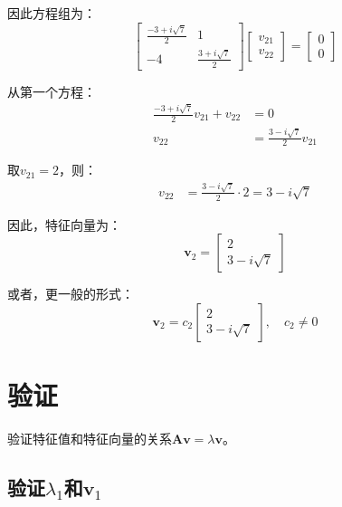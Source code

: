 \documentclass[12pt,a4paper]{article}
\begin{document}
因此方程组为：
\begin{equation}
\begin{bmatrix} \frac{-3 + i\sqrt{7}}{2} & 1 \\ -4 & \frac{3 + i\sqrt{7}}{2} \end{bmatrix} \begin{bmatrix} v_{21} \\ v_{22} \end{bmatrix} = \begin{bmatrix} 0 \\ 0 \end{bmatrix}
\end{equation}

从第一个方程：
\begin{align}
\frac{-3 + i\sqrt{7}}{2} v_{21} + v_{22} &= 0 \\
v_{22} &= \frac{3 - i\sqrt{7}}{2} v_{21}
\end{align}

取$v_{21} = 2$，则：
\begin{align}
v_{22} &= \frac{3 - i\sqrt{7}}{2} \cdot 2 = 3 - i\sqrt{7}
\end{align}

因此，特征向量为：
\begin{equation}
\bm{v}_2 = \begin{bmatrix} 2 \\ 3 - i\sqrt{7} \end{bmatrix}
\end{equation}

或者，更一般的形式：
\begin{equation}
\bm{v}_2 = c_2 \begin{bmatrix} 2 \\ 3 - i\sqrt{7} \end{bmatrix}, \quad c_2 \neq 0
\end{equation}

\section{验证}

验证特征值和特征向量的关系$\bm{A}\bm{v} = \lambda\bm{v}$。

\subsection{验证$\lambda_1$和$\bm{v}_1$}
\end{document}

